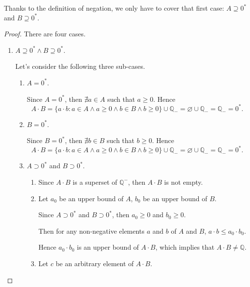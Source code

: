 Thanks to the definition of negation, we only have to cover that first case: $A\supseteq{0}^{*}$ and $B\supseteq{0}^{*}$.

\begin{proof}
    There are four cases.

    \begin{enumerate}[label={\textbf{Case \arabic*.}},itemindent={0.5cm}]
        \item $A\supseteq {0}^{*}\land B\supseteq {0}^{*}$.

              Let's consider the following three sub-cases.
              \begin{enumerate}
                  \item $A = {0}^{*}$.

                        Since $A = {0}^{*}$, then $\nexists a\in A$ such that $a\ge 0$. Hence
                        \[
                            A\cdot B = \{ a\cdot b: a\in A\land a\ge 0\land b\in B\land b\ge 0 \} \cup\mathbb{Q}_{-} = \varnothing\cup\mathbb{Q}_{-} = \mathbb{Q}_{-} = {0}^{*}.
                        \]
                  \item $B = {0}^{*}$.

                        Since $B = {0}^{*}$, then $\nexists b\in B$ such that $b\ge 0$. Hence
                        \[
                            A\cdot B = \{ a\cdot b: a\in A\land a\ge 0\land b\in B\land b\ge 0 \} \cup\mathbb{Q}_{-} = \varnothing\cup\mathbb{Q}_{-} = \mathbb{Q}_{-} = {0}^{*}.
                        \]
                  \item $A\supset{0}^{*}$ and $B\supset{0}^{*}$.
                        \begin{enumerate}[label = (\roman*)]
                            \item Since $A\cdot B$ is a superset of $\mathbb{Q}^{-}$, then $A\cdot B$ is not empty.
                            \item Let $a_{0}$ be an upper bound of $A$, $b_{0}$ be an upper bound of $B$.

                                  Since $A\supset{0}^{*}$ and $B\supset{0}^{*}$, then $a_{0}\ge 0$ and $b_{0}\ge 0$.

                                  Then for any non-negative elements $a$ and $b$ of $A$ and $B$, $a\cdot b \le a_{0}\cdot b_{0}$.

                                  Hence $a_{0}\cdot b_{0}$ is an upper bound of $A\cdot B$, which implies that $A\cdot B\ne\mathbb{Q}$.
                            \item Let $c$ be an arbitrary element of $A\cdot B$.


\end{enumerate}
\end{enumerate}
\end{enumerate}
\end{proof}

